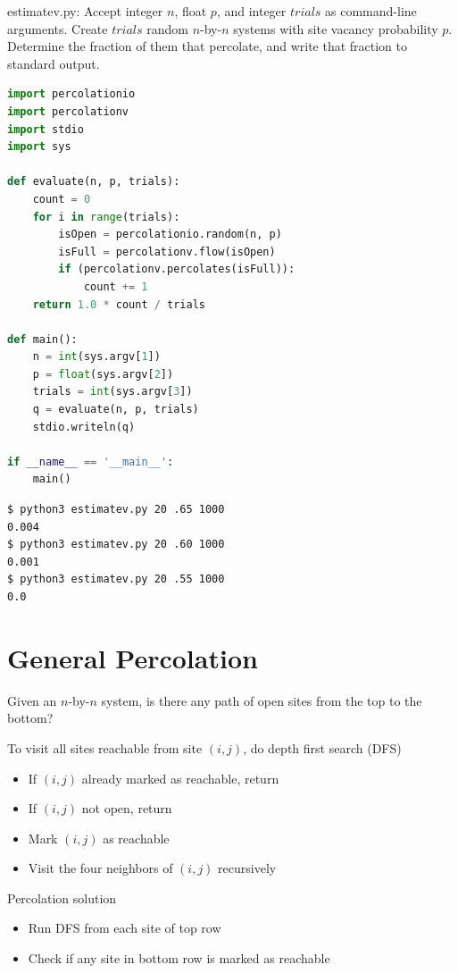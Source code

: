 \documentclass[8pt,a4paper,compress]{beamer}
\begin{document}
\begin{frame}[fragile]
\pause

\begin{framed}
\tiny estimatev.py: Accept integer $n$, float $p$, and integer $trials$ as command-line arguments. Create $trials$ random $n$-by-$n$ systems with site vacancy probability $p$. Determine the fraction of them that percolate, and
write that fraction to standard output.
\end{framed}

\begin{lstlisting}[language=Python,style=focusin]
import percolationio
import percolationv
import stdio
import sys

def evaluate(n, p, trials):
    count = 0
    for i in range(trials):
        isOpen = percolationio.random(n, p)
        isFull = percolationv.flow(isOpen)
        if (percolationv.percolates(isFull)):
            count += 1
    return 1.0 * count / trials

def main():
    n = int(sys.argv[1])
    p = float(sys.argv[2])
    trials = int(sys.argv[3])
    q = evaluate(n, p, trials)
    stdio.writeln(q)
    
if __name__ == '__main__': 
    main()
\end{lstlisting}

\pause

\begin{lstlisting}[language={},style=focusin]
$ python3 estimatev.py 20 .65 1000
0.004
$ python3 estimatev.py 20 .60 1000
0.001
$ python3 estimatev.py 20 .55 1000
0.0
\end{lstlisting}
\end{frame}

\section{General Percolation}
\begin{frame}[fragile]
\pause

Given an $n$-by-$n$ system, is there any path of open sites from the top to the bottom?

\pause
\bigskip

To visit all sites reachable from site $(i, j)$, do depth first search (DFS)
\begin{itemize}
\pause
\item If $(i, j)$ already marked as reachable, return
\pause
\item If $(i, j)$ not open, return
\pause
\item Mark $(i, j)$ as reachable
\pause
\item Visit the four neighbors of $(i, j)$ recursively
\end{itemize}

\pause
\bigskip

Percolation solution
\begin{itemize}
\pause
\item Run DFS from each site of top row
\pause
\item Check if any site in bottom row is marked as reachable
\end{itemize}
\end{frame}
\end{document}

